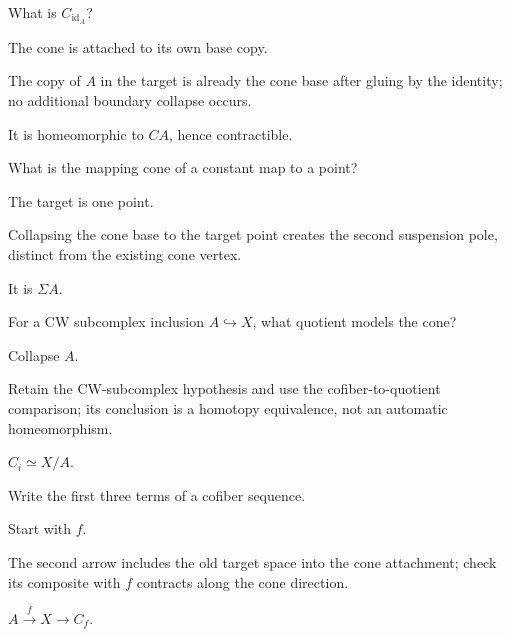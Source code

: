 \begin{exercise}\label{exr:viii07-07}
What is \(C_{\operatorname{id}_A}\)?
\end{exercise}
\begin{hint}
The cone is attached to its own base copy.

The copy of \(A\) in the target is already the cone base after gluing by the identity; no additional boundary collapse occurs.
\end{hint}
\begin{solution}
It is homeomorphic to \(CA\), hence contractible.
\end{solution}

\begin{exercise}\label{exr:viii07-08}
What is the mapping cone of a constant map to a point?
\end{exercise}
\begin{hint}
The target is one point.

Collapsing the cone base to the target point creates the second suspension pole, distinct from the existing cone vertex.
\end{hint}
\begin{solution}
It is \(\Sigma A\).
\end{solution}

\begin{exercise}\label{exr:viii07-09}
For a CW subcomplex inclusion \(A\hookrightarrow X\), what quotient models the cone?
\end{exercise}
\begin{hint}
Collapse \(A\).

Retain the CW-subcomplex hypothesis and use the cofiber-to-quotient comparison; its conclusion is a homotopy equivalence, not an automatic homeomorphism.
\end{hint}
\begin{solution}
\(C_i\simeq X/A\).
\end{solution}

\begin{exercise}\label{exr:viii07-10}
Write the first three terms of a cofiber sequence.
\end{exercise}
\begin{hint}
Start with \(f\).

The second arrow includes the old target space into the cone attachment; check its composite with \(f\) contracts along the cone direction.
\end{hint}
\begin{solution}
\(A\xrightarrow f X\to C_f\).
\end{solution}

